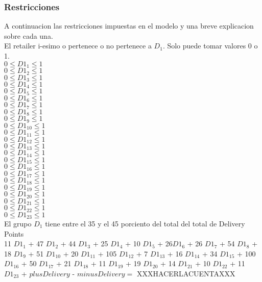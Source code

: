 \subsubsection{Restricciones}
A continuacion las restricciones impuestas en el modelo y una breve explicacion sobre cada una. \\
El retailer i-esimo o pertenece o no pertenece a $D_1$. Solo puede tomar valores 0 o 1. \\
$0 \leq {D1}_1 \leq 1$ \\
$0 \leq {D1}_2 \leq 1$ \\
$0 \leq {D1}_3 \leq 1$ \\
$0 \leq {D1}_4 \leq 1$ \\
$0 \leq {D1}_5 \leq 1$ \\
$0 \leq {D1}_6 \leq 1$ \\
$0 \leq {D1}_7 \leq 1$ \\
$0 \leq {D1}_8 \leq 1$ \\
$0 \leq {D1}_9 \leq 1$ \\
$0 \leq {D1}_{10} \leq 1$ \\
$0 \leq {D1}_{11} \leq 1$ \\
$0 \leq {D1}_{12} \leq 1$ \\
$0 \leq {D1}_{13} \leq 1$ \\
$0 \leq {D1}_{14} \leq 1$ \\
$0 \leq {D1}_{15} \leq 1$ \\
$0 \leq {D1}_{16} \leq 1$ \\
$0 \leq {D1}_{17} \leq 1$ \\
$0 \leq {D1}_{18} \leq 1$ \\
$0 \leq {D1}_{19} \leq 1$ \\
$0 \leq {D1}_{20} \leq 1$ \\
$0 \leq {D1}_{21} \leq 1$ \\
$0 \leq {D1}_{22} \leq 1$ \\
$0 \leq {D1}_{23} \leq 1$ \\

El grupo $D_1$ tiene entre el 35 y el 45 porciento del total del total de Delivery Points \\

11 ${D1}_1$
+ 47 ${D1}_2$
+ 44 ${D1}_3$
+ 25 ${D1}_4$
+ 10 ${D1}_5$
+ 26${D1}_6$
+ 26 ${D1}_7$
+ 54 ${D1}_8$
+ 18 ${D1}_9$
+ 51 ${D1}_{10}$
+ 20 ${D1}_{11}$
+ 105 ${D1}_{12}$
+ 7 ${D1}_{13}$
+ 16 ${D1}_{14}$
+ 34 ${D1}_{15}$
+ 100 ${D1}_{16}$
+ 50 ${D1}_{17}$
+ 21 ${D1}_{18}$
+ 11 ${D1}_{19}$
+ 19 ${D1}_{20}$
+ 14 ${D1}_{21}$
+ 10 ${D1}_{22}$
+ 11 ${D1}_{23}$
+ $plusDelivery$ - $minusDelivery = $ XXXHACERLACUENTAXXX \\


